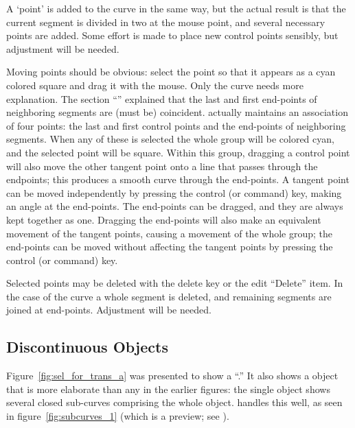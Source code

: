 		A `point' is added to the \IXbezn{} curve in the
		same way, but the actual result is that the current
		segment is divided in two at the mouse point, and
		several necessary points are added. Some effort is
		made to place new  control
		points sensibly, but adjustment will be needed.
		
		Moving points should be obvious: select the point so
		that it appears as a cyan colored square and drag it
		with the mouse. Only the \IXbezn{} curve needs more
		explanation. The section
		``'' explained
		that the last and first end-points of neighboring
		segments are (must be) coincident. \IXpkgu{}
		actually maintains an association of four points:
		the last and first  control points
		and the end-points of neighboring segments. When any
		of these is selected the whole group will be
		colored cyan, and the selected point will be square.
		Within this group, dragging a 
		control point will also move the other tangent
		point onto a line that passes through the endpoints;
		this produces a smooth curve through the end-points.
		A tangent point can be moved independently by
		pressing the control (or command) key, making
		an angle at the end-points. The end-points can
		be dragged, and they are always kept together
		as one. Dragging the end-points will also make
		an equivalent movement of the
		tangent points, causing a movement of the
		whole group; the end-points can be moved
		without affecting the tangent points by
		pressing the control (or command) key.
		
		Selected points may be deleted with the delete key
		or the edit  ``Delete'' item.
		In the case of the
		\IXbezn{} curve a whole segment is
		deleted, and remaining segments are joined at
		end-points. Adjustment will be needed.

		\subsection{Discontinuous Objects}%
		\label{ssec:discont_objects}
		Figure~\ref{fig:sel_for_trans_a} was presented to
		show a
		``.''
		It also shows a \IXspline{} object that is more
		elaborate than any in the earlier figures:
		the single object shows several closed sub-curves
		comprising the whole object.
		\IXpov{} handles this well, as
		seen in figure~\ref{fig:subcurves_1}
		(which is a \IXpov{} preview;
		see ).

